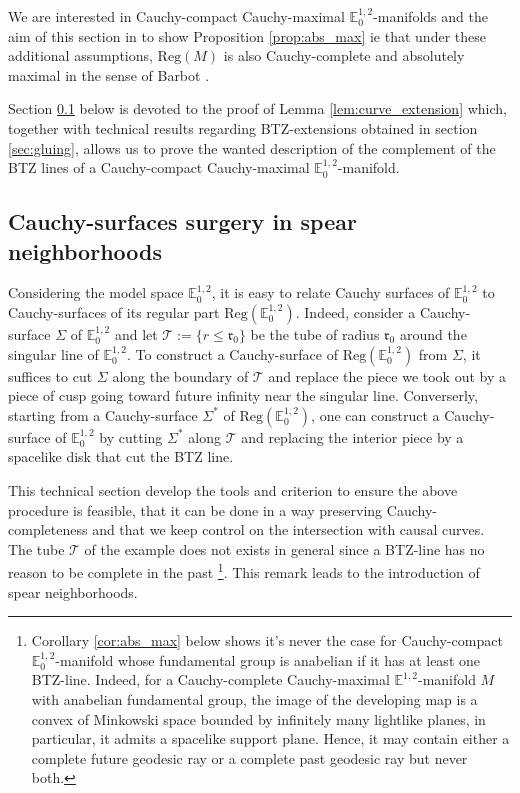 \documentclass[a4paper,12pt]{article}
\def\r{\mathfrak{r}}
\def\T{\mathcal{T}}
\newcommand{\mass}[1]{{\mathbb E}^{1,2}_{#1}}
\def\Reg{\mathrm{Reg}}
\def\reg{\Reg}
\begin{document}
We are interested in Cauchy-compact Cauchy-maximal $\mass{0}$-manifolds and the aim of this section in to show Proposition \ref{prop:abs_max} ie that under these additional assumptions, $\reg(M)$ is also Cauchy-complete and absolutely maximal in the sense of Barbot \cite{barbot_globally_2004}.

Section \ref{sec:surgery} below is devoted to the proof of Lemma \ref{lem:curve_extension} which, together with technical results regarding BTZ-extensions obtained in section \ref{sec:gluing}, allows us to prove the wanted description of the complement of the BTZ lines of a Cauchy-compact Cauchy-maximal $\mass{0}$-manifold.
\subsection{Cauchy-surfaces surgery in spear neighborhoods}\label{sec:surgery}
    
   Considering the model space $\mass{0}$, it is easy to relate Cauchy surfaces of $\mass{0}$ to Cauchy-surfaces of its regular part $\reg(\mass{0})$. Indeed, consider a Cauchy-surface $\Sigma$ of $\mass{0}$ and let $\T:=\{r\leq \r_0\}$ be the tube of radius $\r_0$ around the singular line of $\mass{0}$. To construct a Cauchy-surface of $\reg(\mass{0})$ from $\Sigma$, it suffices to cut $\Sigma$ along the boundary of $\T$ and replace the piece we took out by a piece of cusp going toward future infinity near the singular line. Converserly, starting from a Cauchy-surface $\Sigma^*$ of $\reg(\mass{0})$, one can construct a Cauchy-surface of $\mass{0}$ by cutting $\Sigma^*$ along $\T$ and replacing the interior piece by a spacelike disk that cut the BTZ line. 
   
   This technical section develop the tools and criterion to ensure the above procedure is feasible, that it can be done in a way preserving Cauchy-complete\-ness and that we keep control on the intersection with causal curves. The tube $\T$ of the example does not exists in general since a BTZ-line has no reason to be complete in the past \footnote{Corollary \ref{cor:abs_max} below shows it's never the case for Cauchy-compact $\mass{0}$-manifold whose fundamental group is anabelian if it has at least one BTZ-line. Indeed, for a Cauchy-complete Cauchy-maximal $\mass{}$-manifold $M$ with anabelian fundamental group, the image of the developing map is a convex of Minkowski space bounded by infinitely many lightlike planes, in particular, it admits a spacelike support plane. Hence, it may contain either a complete future geodesic ray or a complete past geodesic ray  but never both.}. This remark leads to the introduction of spear neighborhoods.
   
\end{document}
